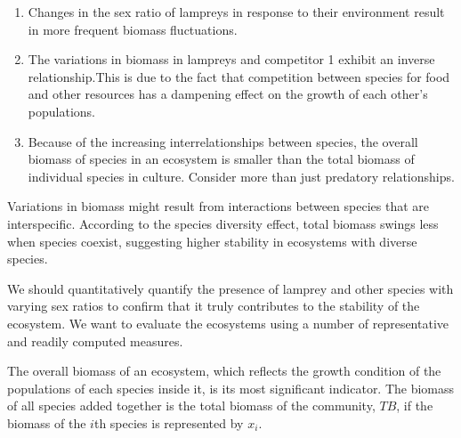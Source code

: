 \documentclass[12pt]{article}  %
\begin{document}


\begin{enumerate}[\bfseries (1).]
	\item Changes in the sex ratio of lampreys in response to their environment result in more frequent biomass fluctuations.
	\item The variations in biomass in lampreys and competitor 1 exhibit an inverse relationship.This is due to the fact that competition between species for food and other resources has a dampening effect on the growth of each other's populations.
	\item Because of the increasing interrelationships between species, the overall biomass of species in an ecosystem is smaller than the total biomass of individual species in culture. Consider more than just predatory relationships.
\end{enumerate}
\par
Variations in biomass might result from interactions between species that are interspecific. According to the species diversity effect, total biomass swings less when species coexist, suggesting higher stability in ecosystems with diverse species.\par
We should quantitatively quantify the presence of lamprey and other species with varying sex ratios to confirm that it truly contributes to the stability of the ecosystem. We want to evaluate the ecosystems using a number of representative and readily computed measures.\par
The overall biomass of an ecosystem, which reflects the growth condition of the populations of each species inside it, is its most significant indicator. The biomass of all species added together is the total biomass of the community, $TB$, if the biomass of the $i$th species is represented by $x_i$.\par
\end{document}
